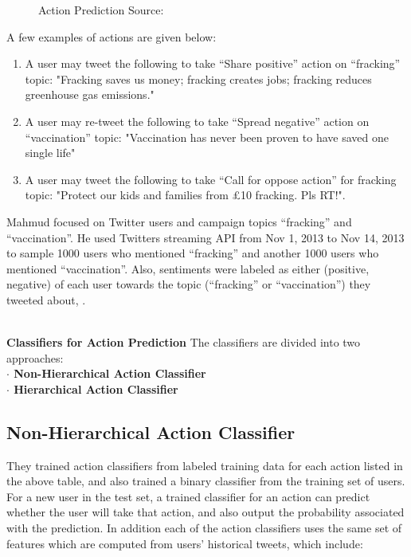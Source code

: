 \begin{figure}[h]
  \centering
  \caption[Action Prediction]%
  {Action Prediction Source: \cite{ref38}}
  \label{fig:ALAP:sm1}
\end{figure}


A few examples of actions are given below:
\begin{enumerate}
\item A user may tweet the following to take “Share positive” action on “fracking” topic:
"Fracking saves us money; fracking creates jobs; fracking reduces greenhouse gas
emissions."
\item A user may re-tweet the following to take “Spread negative” action on “vaccination”
topic: "Vaccination has never been proven to have saved one single life"
\item A user may tweet the following to take “Call for oppose action” for fracking topic:
"Protect our kids and families from \pounds10 fracking. Pls RT!".
\end{enumerate}
Mahmud focused on Twitter users and campaign topics “fracking” and “vaccination”. He used
Twitter\textquotesingle s streaming API from Nov 1, 2013 to Nov 14, 2013 to sample 1000 users who mentioned
“fracking” and another 1000 users who mentioned “vaccination”. Also, sentiments
were labeled as either (positive, negative) of each user towards the topic (“fracking” or
“vaccination”) they tweeted about, \cite{ref38}.

\leavevmode\\
\textbf{Classifiers for Action Prediction}
The classifiers are divided into two approaches:\\
\textbf{$\cdot$ Non-Hierarchical Action Classifier}\\
\textbf{$\cdot$ Hierarchical Action Classifier}

\subsection{Non-Hierarchical Action Classifier}
They trained action classifiers from labeled training data for each action listed in the above table, 
and also trained a binary classifier from the training set of users.\\
For a new user in the test set, a trained classifier for an action can predict whether the user will
take that action, and also output the probability associated with the prediction. In addition each of the action classifiers uses the same set of features which are computed from users' historical
tweets, which include:\\

